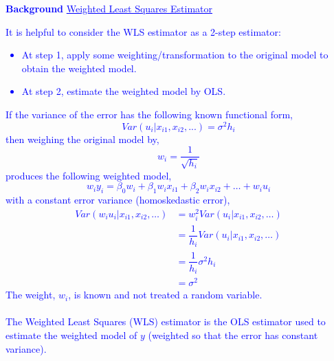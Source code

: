 \documentclass[12pt]{report}
\newenvironment{blueframed}[1][blue]
{\def\FrameCommand{\fboxsep=\FrameSep\fcolorbox{#1}{white}}%
\MakeFramed {\advance\hsize-\width \FrameRestore}}
{\endMakeFramed}
\begin{document}
\justify
\begin{blueframed}
	\textcolor{blue}{\textbf{Background}}
	\vspace{-\baselineskip}
	\justify
	\textcolor{blue}{\underline{Weighted Least Squares Estimator}}
	
	\noindent \textcolor{blue}
	{
		\noindent It is helpful to consider the WLS estimator as a 2-step estimator: \begin{itemize}
			\item At step 1, apply some weighting/transformation to the original model to obtain the weighted model.
			\item At step 2, estimate the weighted model by OLS.
		\end{itemize} If the variance of the error has the following known functional form,
		$$Var(u_i|x_{i1},x_{i2},...) = \sigma^2h_i$$
		\noindent then weighing the original model by,
		$$w_i = \dfrac{1}{\sqrt{h_i}}$$
		\noindent produces the following weighted model, $$w_iy_i = \beta_0w_i + \beta_1w_ix_{i1} + \beta_2w_ix_{i2} + \dots + w_iu_i$$ with a constant error variance 		(homoskedastic error),
		\begin{align*}
		Var(w_iu_i|x_{i1},x_{i2},\dots) &= w^2_iVar(u_i|x_{i1},x_{i2},\dots) \\
		&= \dfrac{1}{h_i}Var(u_i|x_{i1},x_{i2},\dots) \\
		&= \dfrac{1}{h_i}\sigma^2h_i \\
		&= \sigma^2
		\end{align*}
		The weight, $w_i$, is known and not treated a random variable. \\ \\ The Weighted Least Squares (WLS) estimator is the OLS estimator used to estimate the weighted model of $y$ (weighted so that the error has constant variance).
	}
\end{blueframed}
\end{document}
